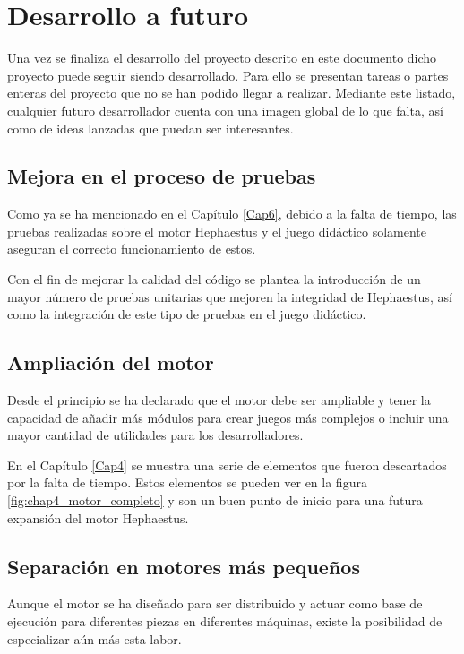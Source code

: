 \section{Desarrollo a futuro}

Una vez se finaliza el desarrollo del proyecto descrito en este documento dicho proyecto puede seguir siendo desarrollado. Para ello se presentan tareas o partes enteras del proyecto que no se han podido llegar a realizar. Mediante este listado, cualquier futuro desarrollador cuenta con una imagen global de lo que falta, así como de ideas lanzadas que puedan ser interesantes.

\subsection{Mejora en el proceso de pruebas}

Como ya se ha mencionado en el Capítulo \ref{Cap6}, debido a la falta de tiempo, las pruebas realizadas sobre el motor Hephaestus y el juego didáctico solamente aseguran el correcto funcionamiento de estos. 

Con el fin de mejorar la calidad del código se plantea la introducción de un mayor número de pruebas unitarias que mejoren la integridad de Hephaestus, así como la integración de este tipo de pruebas en el juego didáctico.

\subsection{Ampliación del motor}

Desde el principio se ha declarado que el motor debe ser ampliable y tener la capacidad de añadir más módulos para crear juegos más complejos o incluir una mayor cantidad de utilidades para los desarrolladores.

En el Capítulo \ref{Cap4} se muestra una serie de elementos que fueron descartados por la falta de tiempo. Estos elementos se pueden ver en la figura \ref{fig:chap4_motor_completo} y son un buen punto de inicio para una futura expansión del motor Hephaestus.

\subsection{Separación en motores más pequeños}

Aunque el motor se ha diseñado para ser distribuido y actuar como base de ejecución para diferentes piezas en diferentes máquinas, existe la posibilidad de especializar aún más esta labor.

